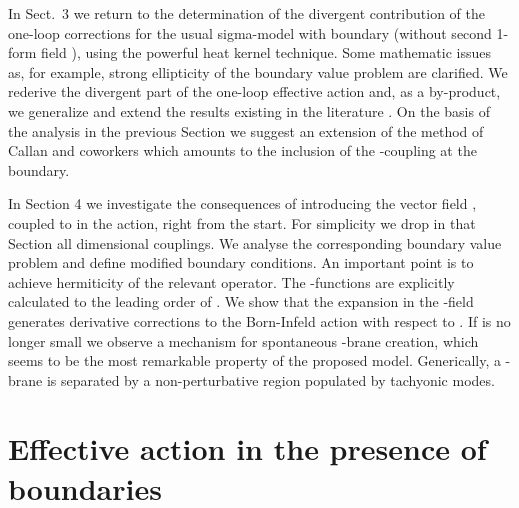 \documentclass[a4paper,12pt]{article}
\begin{document}
In Sect.\ 3 we return to the determination of the divergent 
contribution of the one-loop corrections for the usual 
sigma-model with boundary (without second 1-form field \coordHE{}), 
using the powerful heat kernel technique.  Some
mathematic issues as, for example, strong ellipticity
of the boundary value problem are clarified. We rederive the divergent
part of the one-loop effective action and, as a by-product, 
we generalize and extend
the results existing in the literature 
\cite{dornotto86,Callan88,Osborn91}. On the basis of the analysis in
the previous Section
we suggest an extension
of the method of Callan and coworkers \cite{Callan88} which
amounts to the inclusion of the \coordHE{}-coupling at the boundary.

In Section 4 we investigate the consequences of introducing the vector
field \coordHE{}, coupled to \coordHE{} in the action, right
from the start. For simplicity we drop in that Section all dimensional
couplings. We analyse the corresponding boundary value problem
and define modified boundary conditions.
An important point is to achieve
hermiticity of the relevant operator. The \myHighlight{$\beta$}\coordHE{}-functions are
explicitly calculated to the leading order of \coordHE{}. We show
that the expansion in the \coordHE{}-field generates derivative
corrections to the Born-Infeld action with respect to \coordHE{}.
If \coordHE{} is no longer small we observe a mechanism for
spontaneous \coordHE{}-brane creation, which seems to be the most remarkable
property of the proposed model. Generically, a \coordHE{}-brane is
separated 
by a non-perturbative region populated by
tachyonic modes.

\section{Effective action in the presence of boundaries}
\label{effective}
\end{document}
